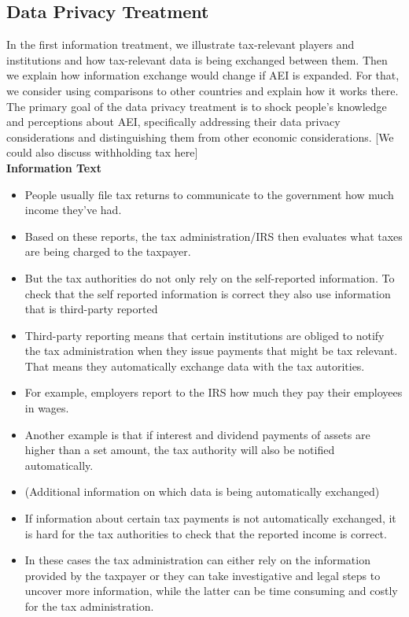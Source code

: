 \documentclass[12pt]{article}
\begin{document}
\subsection*{Data Privacy Treatment}
In the first information treatment, we illustrate tax-relevant players and institutions and how tax-relevant data is being exchanged between them. Then we explain how information exchange would change if AEI is expanded. For that, we consider using comparisons to other countries and explain how it works there. The primary goal of the data privacy treatment is to shock people’s knowledge and perceptions about AEI, specifically addressing their data privacy considerations and distinguishing them from other economic considerations. 
[We could also discuss withholding tax here] \\[0.5em]
\textbf{Information Text}
\begin{itemize}
    \item People usually file tax returns to communicate to the government how much income they've had.
    \item Based on these reports, the tax administration/IRS then evaluates what taxes are being charged to the taxpayer.  
    \item But the tax authorities do not only rely on the self-reported information. To check that the self reported information is correct they also use information that is third-party reported 
    \item Third-party reporting means that certain institutions are obliged to notify the tax administration when they issue payments that might be tax relevant. That means they automatically exchange data with the tax autorities.
    \item For example, employers report to the IRS how much they pay their employees in wages. 
    \item Another example is that if interest and dividend payments of assets are higher than a set amount, the tax authority will also be notified automatically. 
    \item (Additional information on which data is being automatically exchanged)
    \item If information about certain tax payments is not automatically exchanged, it is hard for the tax authorities to check that the reported income is correct. 
    \item In these cases the tax administration can either rely on the information provided by the taxpayer or they can take investigative and legal steps to uncover more information, while the latter can be time consuming and costly for the tax administration.

\end{itemize}
\end{document}

